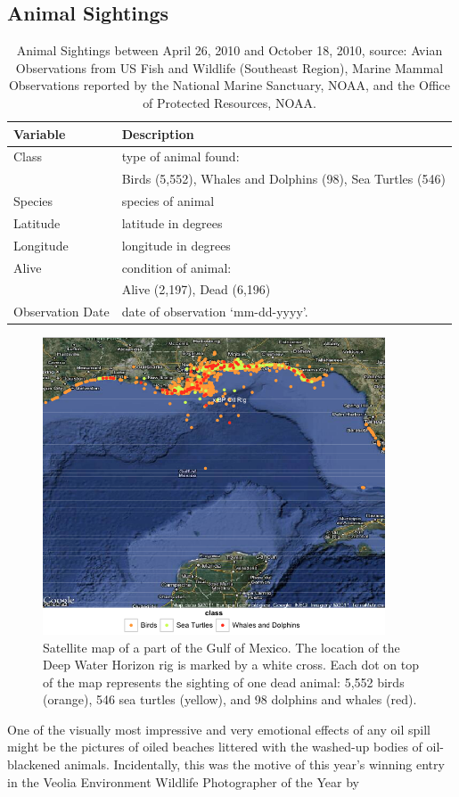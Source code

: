 \documentclass[authoryear,12pt]{elsarticle}
\begin{document}
\subsection{Animal Sightings}
\begin{table}
\begin{tabular}[hbt]{lp{11cm}}\hline
\bf Variable & \bf Description \\\hline
Class & type of animal found: \\
& {\small Birds (5,552),   Whales and Dolphins  (98),  Sea Turtles (546)}\\
Species & species of animal \\
Latitude & latitude in degrees  \\
Longitude & longitude in degrees\\
Alive & condition of animal: \\
& {\small Alive (2,197), Dead (6,196)} \\
Observation Date & date of observation `mm-dd-yyyy'. \\\hline
\end{tabular}
\caption{Animal Sightings between April 26, 2010 and October 18, 2010, source: Avian Observations from US Fish and Wildlife (Southeast Region),  Marine Mammal Observations reported by  the National Marine Sanctuary, NOAA, and the Office of Protected Resources, NOAA.}
\label{table-animal}
\end{table}
\begin{figure}[htbp] %
   \centering
   \includegraphics[width=4in]{animal_deaths.png} 
   \caption{Satellite map of a part of the Gulf of Mexico. The location of the Deep Water Horizon rig is marked by a white cross. Each dot on top of the map represents the sighting of one dead animal: 5,552  birds (orange), 546 sea turtles (yellow), and 98 dolphins and whales (red). }
   \label{deaths}
\end{figure}
One of the visually most impressive and very emotional effects of any oil spill might be the pictures of oiled beaches littered with the washed-up bodies of oil-blackened animals. Incidentally, this was the motive of this year's winning entry in the Veolia Environment Wildlife Photographer of the Year by \citet{photo}
\end{document}
